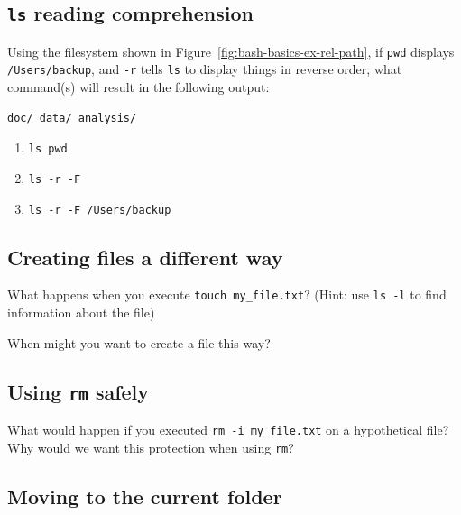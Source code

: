 \documentclass[
]{krantz}
\providecommand{\tightlist}{%
  \setlength{\itemsep}{0pt}\setlength{\parskip}{0pt}}
\begin{document}
\hypertarget{bash-basics-ex-reading-ls}{%
\subsection{\texorpdfstring{\texttt{ls} reading comprehension}{ls reading comprehension}}\label{bash-basics-ex-reading-ls}}

Using the filesystem shown in Figure~\ref{fig:bash-basics-ex-rel-path},
if \texttt{pwd} displays \texttt{/Users/backup},
and \texttt{-r} tells \texttt{ls} to display things in reverse order,
what command(s) will result in the following output:

\begin{verbatim}
doc/ data/ analysis/
\end{verbatim}

\begin{enumerate}
\def\labelenumi{\arabic{enumi}.}
\tightlist
\item
  \texttt{ls\ pwd}
\item
  \texttt{ls\ -r\ -F}
\item
  \texttt{ls\ -r\ -F\ /Users/backup}
\end{enumerate}

\hypertarget{bash-basics-ex-touch}{%
\subsection{Creating files a different way}\label{bash-basics-ex-touch}}

What happens when you execute \texttt{touch\ my\_file.txt}?
(Hint: use \texttt{ls\ -l} to find information about the file)

When might you want to create a file this way?

\hypertarget{bash-basics-ex-safe-rm}{%
\subsection{\texorpdfstring{Using \texttt{rm} safely}{Using rm safely}}\label{bash-basics-ex-safe-rm}}

What would happen if you executed \texttt{rm\ -i\ my\_file.txt}
on a hypothetical file?
Why would we want this protection when using \texttt{rm}?

\hypertarget{bash-basics-ex-move-dot}{%
\subsection{Moving to the current folder}\label{bash-basics-ex-move-dot}}
\end{document}
